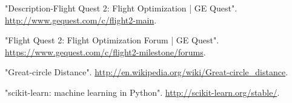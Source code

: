 \documentclass{article}[12pt]
\begin{document}
\begin{multicols}{2}
\begin{thebibliography}{1}

 "Description-Flight Quest 2: Flight Optimization | GE Quest". \url{http://www.gequest.com/c/flight2-main}.

 "Flight Quest 2: Flight Optimization Forum | GE Quest". \url{https://www.gequest.com/c/flight2-milestone/forums}.

 "Great-circle Distance". \url{http://en.wikipedia.org/wiki/Great-circle_distance}.

 "scikit-learn: machine learning in Python". \url{http://scikit-learn.org/stable/}.

\end{thebibliography}
\end{multicols}
\end{document}
